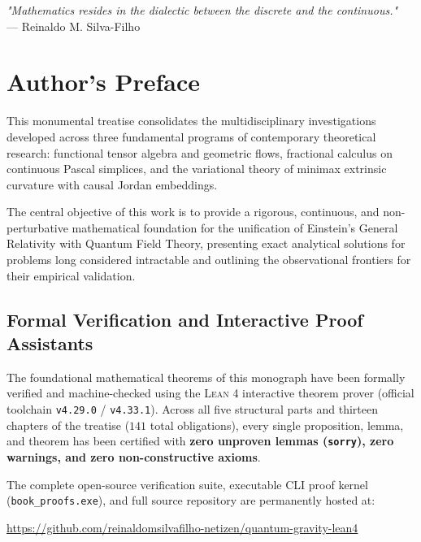 \documentclass[11pt,a4paper,openright,twoside]{book}
\begin{document}
\vspace{1.5cm}

\begin{flushright}
\textit{"Mathematics resides in the dialectic between the discrete and the continuous."} \\
\vspace{0.2cm}
--- Reinaldo M. Silva-Filho
\end{flushright}
\vfill
\clearpage

\chapter*{Author's Preface}
This monumental treatise consolidates the multidisciplinary investigations developed across three fundamental programs of contemporary theoretical research: functional tensor algebra and geometric flows, fractional calculus on continuous Pascal simplices, and the variational theory of minimax extrinsic curvature with causal Jordan embeddings.

The central objective of this work is to provide a rigorous, continuous, and non-perturbative mathematical foundation for the unification of Einstein's General Relativity with Quantum Field Theory, presenting exact analytical solutions for problems long considered intractable and outlining the observational frontiers for their empirical validation.

\section*{Formal Verification and Interactive Proof Assistants}
The foundational mathematical theorems of this monograph have been formally verified and machine-checked using the \textsc{Lean 4} interactive theorem prover (official toolchain \texttt{v4.29.0} / \texttt{v4.33.1}). Across all five structural parts and thirteen chapters of the treatise ($141$ total obligations), every single proposition, lemma, and theorem has been certified with \textbf{zero unproven lemmas (\texttt{sorry}), zero warnings, and zero non-constructive axioms}.

The complete open-source verification suite, executable CLI proof kernel (\texttt{book\_proofs.exe}), and full source repository are permanently hosted at:
\begin{center}
\url{https://github.com/reinaldomsilvafilho-netizen/quantum-gravity-lean4}
\end{center}
\end{document}
